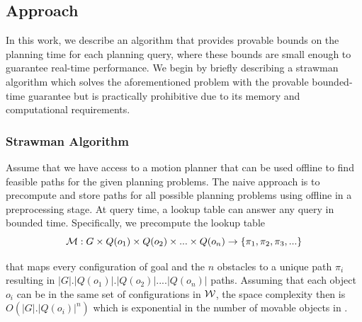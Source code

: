 \documentclass[a4paper]{report}
\begin{document}
\subsection{Approach}
In this work, we describe an algorithm that provides provable bounds on the planning time for each planning query, where these bounds are small enough to guarantee real-time performance.
We begin by briefly describing a strawman algorithm which solves the aforementioned problem with the provable bounded-time guarantee but is practically prohibitive due to its memory and computational requirements.


\subsubsection{Strawman Algorithm}
Assume that we have access to a motion planner \calP that can be used offline to find feasible paths for the given planning problems. The naive approach
is to precompute and store paths for all possible planning problems using \calP %
offline in a preprocessing stage.
At query time, a lookup table can answer any query in bounded time. Specifically, we precompute the lookup table
$$
\mathcal{M} : G \times Q(o_1) \times Q(o_2) \times ... \times Q(o_n) \rightarrow \{\pi_1, \pi_2,\pi_3,...\}
$$

\noindent that maps every configuration of goal and the $n$ obstacles to a unique path $\pi_i$ resulting in $|G|.|Q(o_1)|.|Q(o_2)|....|Q(o_n)|$ paths. Assuming that each object $o_i$ can be in the same set of configurations in $\mathcal{W}$, the space complexity then is $O(|G|.|Q(o_i)|^{n})$ which is exponential in the number of movable objects in \calO.
\end{document}
